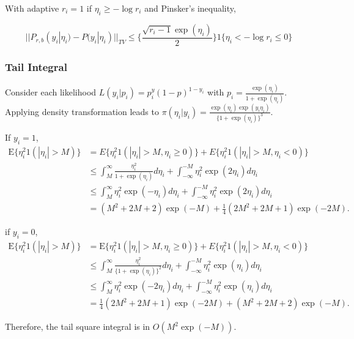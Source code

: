 \documentclass[10pt]{article}
\begin{document}
With adaptive $r_i=1$ if $\eta_{i}\ge -\log r_i$ and Pinsker's inequality,

$$||P_{r,b}(y_i|\eta_{i}) - P(y_i|\eta_{i})||_{TV} \le   \{   \frac{\sqrt{r_{i}-1}  \exp(\eta_{i})}{2} \} 1 \{\eta_{i}< - \log r_{i} \le 0 \}$$

\subsubsection{Tail Integral}

Consider each likelihood $L(y_i|p_i) = p^y_i (1-p)^{1-y_i}$ with $p_i=\frac{\exp(\eta_{i})}{1+\exp(\eta_{i})}$. Applying density transformation leads to 
$\pi(\eta_{i}|y_i) = \frac{\exp(\eta_{i}) \exp(y_i\eta_{i})}{\{1+\exp(\eta_{i})\}^3}$.

If $y_i=1$,
\begin{equation}
	\begin{aligned}
			\mbox{E}\{ \eta_{i}^2 1(|\eta_{i}|>M) \} & = E\{ \eta_{i}^2 1(|\eta_{i}|>M, \eta_{i} \ge 0 ) \} + E\{ \eta_{i}^2 1(|\eta_{i}|>M, \eta_{i}<0 ) \} \\
	& \le \int_M^{\infty} \frac{\eta_{i}^2}{1+\exp(\eta_{i})} d\eta_{i} + \int_{-\infty}^{-M}{\eta_{i}^2}{\exp(2\eta_{i})}d\eta_{i}  \\
	& \le \int_M^{\infty} {\eta_{i}^2}{\exp(-\eta_{i})} d\eta_{i} +\int_{-\infty}^{-M}{\eta_{i}^2}{\exp(2\eta_{i})}d\eta_{i} \\
	& = (M^2+2M+2)\exp(-M) + \frac{1}{4} (2M^2 + 2M +1) \exp(-2M).
	\end{aligned}
\end{equation}

if $y_i=0$,
\begin{equation}
	\begin{aligned}
			\mbox{E}\{ \eta_{i}^2 1(|\eta_{i}|>M) \} & = \mbox{E}\{ \eta_{i}^2 1(|\eta_{i}|>M, \eta_{i} \ge 0 ) \} + E\{ \eta_{i}^2 1(|\eta_{i}|>M, \eta_{i}<0 ) \} \\
	& \le \int_M^{\infty} \frac{\eta_{i}^2}{\{1+\exp(\eta_{i})\}^2} d\eta_{i} + \int_{-\infty}^{-M}{\eta_{i}^2}{\exp(\eta_{i})}d\eta_{i}  \\
	& \le \int_M^{\infty} {\eta_{i}^2}{\exp(-2\eta_{i})} d\eta_{i} + \int_{-\infty}^{-M}{\eta_{i}^2}{\exp(\eta_{i})}d\eta_{i} \\
	& =\frac{1}{4} (2M^2 + 2M +1) \exp(-2M)+  (M^2+2M+2)\exp(-M) .
	\end{aligned}
\end{equation}

Therefore, the tail square integral is in $O(M^2 \exp(-M))$.
\end{document}
